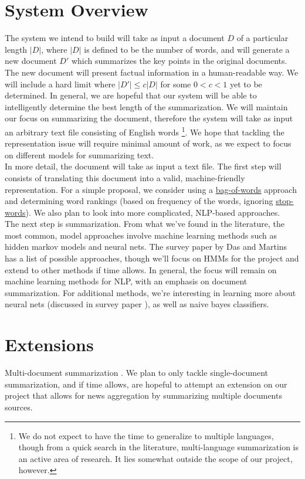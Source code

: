 \documentclass[10pt]{article}
\begin{document}
\section{System Overview}
The system we intend to build will take as input a document $D$ of a particular length $|D|$, where $|D|$ is defined to be the number of words, and will generate a new document $D'$ which summarizes the key points in the original documents. The new document will present factual information in a human-readable way.  We will include a hard limit where $|D'| \leq c|D|$ for some $0 < c < 1$ yet to be determined. In general, we are hopeful that our system will be able to intelligently determine the best length of the summarization. We will maintain our focus on summarizing the document, therefore the system will take as input an arbitrary text file consisting of English words \footnote{We do not expect to have the time to generalize to multiple languages, though from a quick search in the literature, multi-language summarization is an active area of research. It lies somewhat outside the scope of our project, however.}. We hope that tackling the representation issue will require minimal amount of work, as we expect to focus on different models for summarizing text. \\

In more detail, the document will take as input a text file. The first step will consists of translating this document into a valid, machine-friendly representation. For a simple proposal, we consider using a \href{https://en.wikipedia.org/wiki/Bag-of-words_model}{bag-of-words} approach and determining word rankings (based on frequency of the words, ignoring \href{https://en.wikipedia.org/wiki/Stop_words}{stop-words}). We also plan to look into more complicated, NLP-based approaches. \\

The next step is summarization. From what we’ve found in the literature, the most common, model approaches involve machine learning methods such as hidden markov models and neural nets. The survey paper by Das and Martins \cite{survey} has a list of possible approaches, though we’ll focus on HMMs for the project and extend to other methods if time allows. In general, the focus will remain on machine learning methods for NLP, with an emphasis on document summarization. For additional methods, we're interesting in learning more about neural nets (discussed in survey paper \cite{survey}), as well as naive bayes classifiers.

\section{Extensions}
Multi-document summarization \cite{multi_document}. We plan to only tackle single-document summarization, and if time allows, are hopeful to attempt an extension on our project that allows for news aggregation by summarizing multiple documents sources. \\
\end{document}

